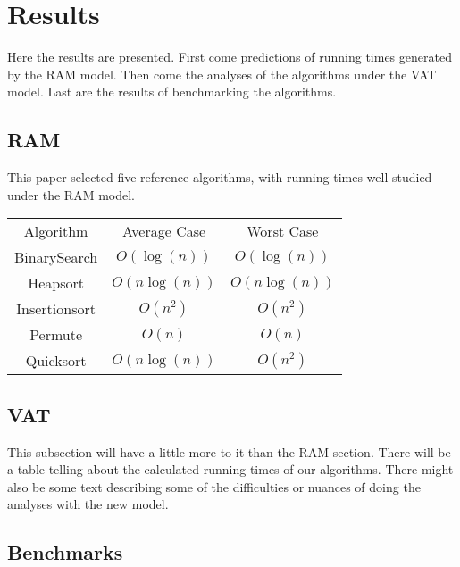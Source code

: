 \section{Results}

  Here the results are presented. First come predictions of running times
  generated by the RAM model. Then come the analyses of the algorithms under
  the VAT model. Last are the results of benchmarking the algorithms.

  \subsection{RAM}
    This paper selected five reference algorithms, with running times well 
    studied under the RAM model.
    
    \begin{tabular}{ccc}
      Algorithm     & Average Case  & Worst Case   \\
      BinarySearch  & $O(\log(n))$  & $O(\log(n))$ \\
      Heapsort      & $O(n\log(n))$ & $O(n\log(n))$\\
      Insertionsort & $O(n^2)$      & $O(n^2)$     \\
      Permute       & $O(n)$        & $O(n)$       \\
      Quicksort     & $O(n\log(n))$ & $O(n^2)$     \\
    \end{tabular}

  \subsection{VAT}
     This subsection will have a little more to it than the RAM section. There
     will be a table telling about the calculated running times of our 
     algorithms. There might also be some text describing some of the 
     difficulties or nuances of doing the analyses with the new model.

  \subsection{Benchmarks}
     